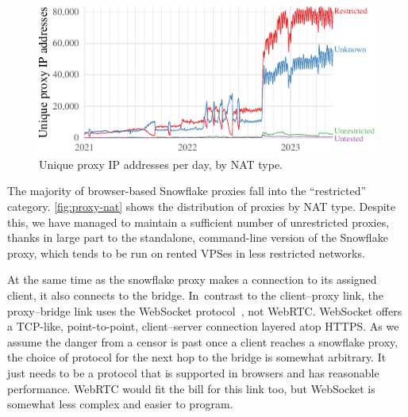 \documentclass[letterpaper,twocolumn]{article}
\begin{document}
\begin{figure}[t]
\includegraphics{figures/proxies/proxy-nat-type}
\caption{
Unique proxy IP addresses per day,
by NAT type.
}
\label{fig:proxy-nat}
\end{figure}

The majority of browser-based Snowflake proxies
fall into the ``restricted'' category.
\autoref{fig:proxy-nat} shows the distribution of proxies by NAT type.
Despite this, we have managed to maintain a sufficient number of unrestricted proxies,
thanks in large part to the standalone, command-line
version of the Snowflake proxy,
which tends to be run on rented VPSes in less restricted networks.

At the same time as the snowflake proxy makes a connection to its assigned client,
it also connects to the bridge.
In~contrast to the client--proxy link,
the proxy--bridge link
uses the WebSocket protocol~\cite{rfc6455}, not WebRTC.
WebSocket offers a TCP-like, point-to-point, client--server connection
layered atop HTTPS.
As we assume the danger from a censor is past
once a client reaches a snowflake proxy,
the choice of protocol for the next hop to the bridge is somewhat arbitrary.
It just needs to be a protocol that is supported in browsers
and has reasonable performance.
WebRTC would fit the bill for this link too,
but WebSocket is somewhat less complex and easier to program.
\end{document}
